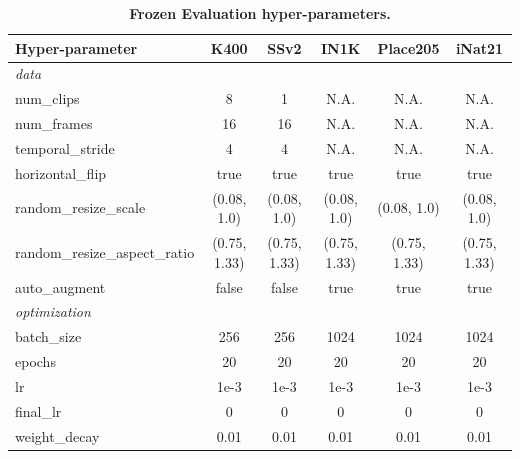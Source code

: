 \documentclass[twocolumn]{fairmeta}
\theoremstyle{plain}
\theoremstyle{definition}
\theoremstyle{remark}
\begin{document}
\begin{table}
    \centering
    \caption{\bf\small Frozen Evaluation hyper-parameters.}
    \label{tab:frozen_hp}
    {\fontsize{9pt}{9pt}\selectfont
    \setlength{\tabcolsep}{2pt}
    \begin{tabular}{l c c c c c}
        \toprule
        Hyper-parameter & K400 & SSv2 & IN1K & Place205 & iNat21 \\
        \midrule \textit{data} \\
        num\_clips & 8 & 1 & N.A. & N.A. & N.A. \\
        num\_frames & 16 & 16 & N.A. & N.A. & N.A.\\
        temporal\_stride & 4 & 4 & N.A. & N.A. & N.A. \\
        horizontal\_flip & true & true & true & true & true\\
        random\_resize\_scale & (0.08, 1.0) & (0.08, 1.0) & (0.08, 1.0) & (0.08, 1.0) & (0.08, 1.0)\\
        random\_resize\_aspect\_ratio & (0.75, 1.33) & (0.75, 1.33) & (0.75, 1.33) & (0.75, 1.33) & (0.75, 1.33)\\
        auto\_augment & false & false & true & true & true \\
        \midrule \textit{optimization} \\
        batch\_size & 256 & 256 & 1024 & 1024 & 1024 \\
        epochs & 20 & 20 & 20 & 20 & 20\\
        lr & 1e-3 & 1e-3 & 1e-3 & 1e-3 & 1e-3  \\
        final\_lr & 0 & 0 & 0 & 0 & 0\\
        weight\_decay & 0.01 & 0.01 & 0.01 & 0.01 & 0.01 \\\bottomrule
    \end{tabular}}
\end{table}
\end{document}
